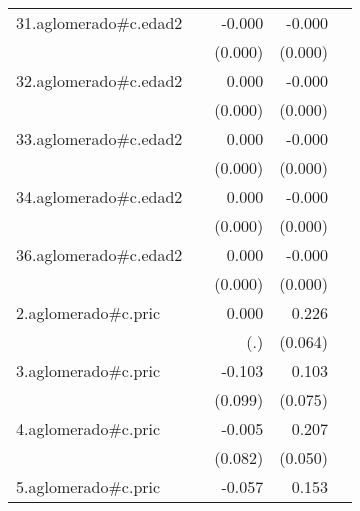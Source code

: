{\begin{longtable}{l*{4}{D{.}{.}{-1}}}
\addlinespace
31.aglomerado#c.edad2&                     &      -0.000         &      -0.000\sym{*}  &                     \\
            &                     &     (0.000)         &     (0.000)         &                     \\
\addlinespace
32.aglomerado#c.edad2&                     &       0.000         &      -0.000         &                     \\
            &                     &     (0.000)         &     (0.000)         &                     \\
\addlinespace
33.aglomerado#c.edad2&                     &       0.000         &      -0.000\sym{***}&                     \\
            &                     &     (0.000)         &     (0.000)         &                     \\
\addlinespace
34.aglomerado#c.edad2&                     &       0.000         &      -0.000\sym{*}  &                     \\
            &                     &     (0.000)         &     (0.000)         &                     \\
\addlinespace
36.aglomerado#c.edad2&                     &       0.000         &      -0.000         &                     \\
            &                     &     (0.000)         &     (0.000)         &                     \\
\addlinespace
2.aglomerado#c.pric&                     &       0.000         &       0.226\sym{***}&                     \\
            &                     &         (.)         &     (0.064)         &                     \\
\addlinespace
3.aglomerado#c.pric&                     &      -0.103         &       0.103         &                     \\
            &                     &     (0.099)         &     (0.075)         &                     \\
\addlinespace
4.aglomerado#c.pric&                     &      -0.005         &       0.207\sym{***}&                     \\
            &                     &     (0.082)         &     (0.050)         &                     \\
\addlinespace
5.aglomerado#c.pric&                     &      -0.057         &       0.153\sym{*}  &                     \\

\end{longtable}}
